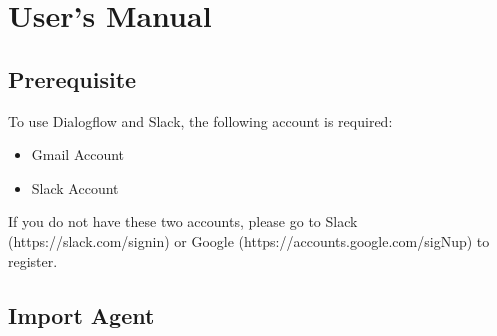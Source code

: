 
\chapter{User's Manual} %
\label{cha:user_s_manual}

\section{Prerequisite} %
\label{sec:prerequisite}
To use Dialogflow and Slack, the following account is required:
\begin{itemize}
	\item Gmail Account
	\item Slack Account
\end{itemize}
If you do not have these two accounts, please go to Slack (https://slack.com/signin) or Google (https://accounts.google.com/sigNup) to register.

\clearpage


\section{Import Agent} %
\label{sec:import_agent}

